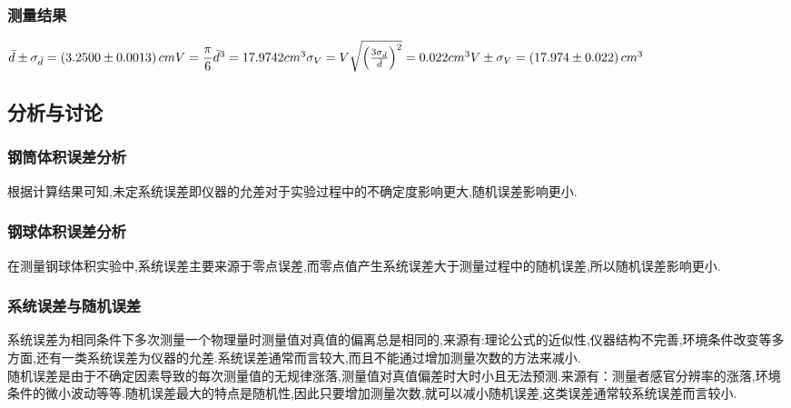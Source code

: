 \documentclass[a4 paper,12pt]{article}
\begin{document}
\subsubsection{测量结果}
\noindent
$\bar{d}\pm\sigma_{\bar{d}}=\left(3.2500\pm0.0013\right)cm\\
V=\dfrac{\pi}{6}\bar{d}^{3}=17.9742cm^{3}\\
\sigma_{V}=V\sqrt{\left(\frac{3\sigma_{\bar{d}}}{\bar{d}}\right)^{2}}=0.022cm^{3}\\
V\pm\sigma_{V}=\left(17.974\pm0.022\right)cm^{3}$
\subsection{分析与讨论}
\subsubsection{钢筒体积误差分析}
根据计算结果可知,未定系统误差即仪器的允差对于实验过程中的不确定度影响更大,随机误差影响更小.
\subsubsection{钢球体积误差分析}
在测量钢球体积实验中,系统误差主要来源于零点误差,而零点值产生系统误差大于测量过程中的随机误差,所以随机误差影响更小.
\subsubsection{系统误差与随机误差}
系统误差为相同条件下多次测量一个物理量时测量值对真值的偏离总是相同的,来源有:理论公式的近似性,仪器结构不完善,环境条件改变等多方面,还有一类系统误差为仪器的允差.系统误差通常而言较大,而且不能通过增加测量次数的方法来减小.\\

 随机误差是由于不确定因素导致的每次测量值的无规律涨落,测量值对真值偏差时大时小且无法预测.来源有：测量者感官分辨率的涨落,环境条件的微小波动等等.随机误差最大的特点是随机性,因此只要增加测量次数,就可以减小随机误差,这类误差通常较系统误差而言较小.
\end{document}
